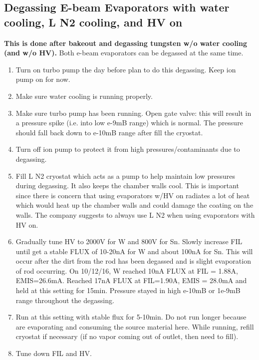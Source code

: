 \subsection{Degassing E-beam Evaporators with water cooling, L N2 cooling, and HV on}
\textbf{This is done after bakeout and degassing tungsten w/o water cooling (and w/o HV).}
Both e-beam evaporators can be degassed at the same time.
\begin{enumerate}
\item	Turn on turbo pump the day before plan to do this degassing. Keep ion pump on for now.
\item	Make sure water cooling is running properly.
\item	Make sure turbo pump has been running. Open gate valve: this will result in a pressure spike (i.e. into low e-9mB range) which is normal. The pressure should fall back down to e-10mB range after fill the cryostat. 
\item	Turn off ion pump to protect it from high pressures/contaminants due to degassing.
\item	Fill L N2 cryostat which acts as a pump to help maintain low pressures during degassing. It also keeps the chamber walls cool. This is important since there is concern that using evaporators w/HV on radiates a lot of heat which would heat up the chamber walls and could damage the coating on the walls. The company suggests to always use L N2 when using evaporators with HV on.
\item	Gradually tune HV to 2000V for W and 800V for Sn. Slowly increase FIL until get a stable FLUX of 10-20nA for W and about 100nA for Sn. This will occur after the dirt from the rod has been degassed and is slight evaporation of rod occurring. 
On 10/12/16, W reached 10nA FLUX at FIL = 1.88A, EMIS=26.6mA. Reached 17nA FLUX at FIL=1.90A, EMIS = 28.0mA and held at this setting for 15min. Pressure stayed in high e-10mB or 1e-9mB range throughout the degassing.
\item	Run at this setting with stable flux for 5-10min. Do not run longer because are evaporating and consuming the source material here. While running, refill cryostat if necessary (if no vapor coming out of outlet, then need to fill).
\item	Tune down FIL and HV.
\end{enumerate}

